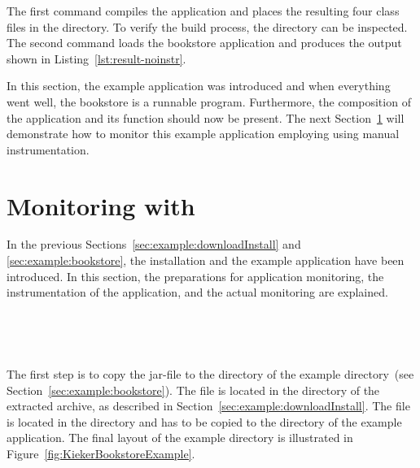 \noindent The first command compiles the application and places the resulting four class files in the  directory. To verify the build process, the  directory can be inspected. The second command loads the bookstore application and produces the output shown in Listing~\ref{lst:result-noinstr}.



\noindent In this section, the \Kieker{} example application was introduced and when everything went well, the bookstore is a runnable program. Furthermore, the composition of the application and its function should now be present. %
The next Section~\ref{sec:example:monitoring} will demonstrate how %
to monitor this example application employing \KiekerMonitoringPart{} using manual instrumentation.

\pagebreak

\section{Monitoring with \KiekerMonitoringPart{}}\label{sec:example:monitoring}

In the previous Sections~\ref{sec:example:downloadInstall} and \ref{sec:example:bookstore}, the \Kieker{} installation and the example application have been introduced. In this section, the preparations for application monitoring, the instrumentation of the application, and the actual monitoring are explained.

\quad\


\

\noindent The first step is to copy the \Kieker{} jar-file \file{\mainJar} to the  directory of the example directory~(see Section~\ref{sec:example:bookstore}). The file is located in the  directory of the extracted \Kieker{} archive, as described in Section~\ref{sec:example:downloadInstall}. %
The file \file{\commonsLoggingJar} is located in the  directory and has to be copied to the  directory of the example application. The final layout of the example directory is illustrated in Figure~\ref{fig:KiekerBookstoreExample}.

